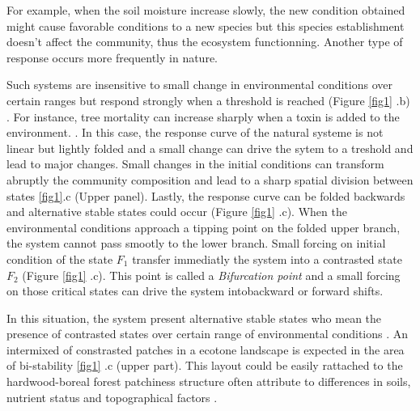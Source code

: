
For example, when the soil moisture increase slowly, the new condition
obtained might cause favorable conditions to a new species but this species
establishment doesn't affect the community, thus the ecosystem functionning.
Another type of response occurs more frequently in nature.


Such systems are insensitive to small change in environmental conditions over
certain ranges but respond strongly when a threshold is reached (Figure
\ref{fig1} .b) \cite{scheffer2009critical}. For instance, tree mortality can
increase sharply when a toxin is added to the environment.
\cite{scheffer2009critical}. In this case, the response curve of the natural
systeme is not linear but lightly folded and a small change can drive the
sytem to a treshold and lead to major changes. Small changes in the initial
conditions can transform abruptly the community composition and lead to a
sharp spatial division between states \ref{fig1}.c (Upper panel). Lastly, the
response curve can be folded backwards and alternative stable states could
occur (Figure \ref{fig1} .c).  When the environmental conditions approach a
tipping point on the folded upper branch, the system cannot pass smootly to
the lower branch. Small forcing on initial condition of the state $F_1$
transfer immediatly the system into a contrasted state $F_2$ (Figure
\ref{fig1} .c). This point is called a \textit{Bifurcation point} and a small
forcing on those critical states can drive the system intobackward or forward
shifts.


In this situation, the system present alternative stable states who mean the
presence of contrasted states over certain range of environmental conditions
\cite{scheffer2009critical}. An intermixed of constrasted patches in a ecotone
landscape is expected in the area of bi-stability \ref{fig1} .c (upper part).
This layout could be easily rattached to the hardwood-boreal forest patchiness
structure often attribute to differences in soils, nutrient status and
topographical factors \cite{Society2014}.\\


